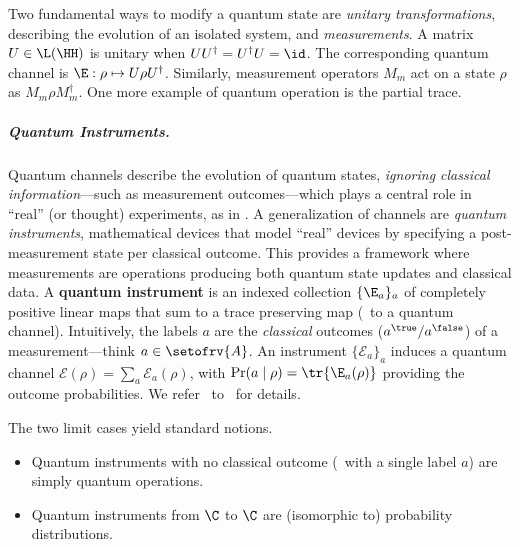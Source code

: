 \begin{example}
Two fundamental ways to modify a quantum state are \emph{unitary transformations}, describing the evolution of an isolated system, and \emph{measurements}.
A matrix $U\in\L(\HH)$ is unitary when $UU^\dagger = U^\dagger U = \id$.
The corresponding quantum channel is $\E:\rho \mapsto U \rho U^\dagger$.
Similarly, measurement operators $M_m$ act on a state $\rho$ as $M_m \rho M_m^\dagger$.
One more example of quantum operation is the partial trace.
\end{example}

\subparagraph{Quantum Instruments.}

Quantum channels describe the evolution of quantum states, \emph{ignoring classical information}---such as measurement outcomes---which plays a central role in ``real'' (or thought) experiments, as in .
A generalization of channels are \emph{quantum instruments}, mathematical devices that model ``real'' devices by specifying a post-measurement state per classical outcome.
This provides a framework where measurements are operations producing both quantum state updates and classical data.
A \textbf{quantum instrument} is an indexed collection $\{\E_a\}_a$ of completely positive linear maps that sum to a trace preserving map (\ie\ to a quantum channel).
Intuitively, the labels $a$ are the \emph{classical} outcomes ($a^\true/a^\false$) of a measurement---think $a\in \setofrv{A}$.
An instrument $\{\mathcal{E}_{a}\}_{a}$ induces a quantum channel $\mathcal{E}(\rho) =\sum_{a} \mathcal{E}_{a}(\rho)$, with $\Pr(a \mid \rho) = \tr{\mathcal{\E}_{a}(\rho)}$ providing the outcome probabilities.
We refer \eg\ to~\cite[page~112]{Watrous_book} for details.

\begin{remark}
\label{rem:qi_pr}
The two limit cases yield standard notions.
\begin{itemize}
\item
Quantum instruments with no classical outcome (\ie\ with a single label $a$) are simply quantum operations.
\item
Quantum instruments from $\C$ to $\C$ are (isomorphic to) probability distributions.
\end{itemize}
\end{remark}

